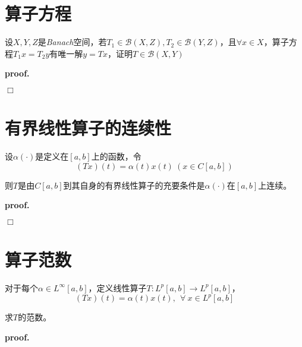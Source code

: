 \section{算子方程}

\begin{mdframed}
    \begin{question}
        设$X,Y,Z$是\textsl{Banach}空间，若$T_1\in \mathcal{B}(X,Z),T_2\in \mathcal{B}(Y,Z)$，且$\forall x\in X$，算子方程$T_1x=T_2y$有唯一解$y=Tx$，证明$T\in \mathcal{B}(X,Y)$
    \end{question}
\end{mdframed}

\textbf{proof.}

$\Box$

\section{有界线性算子的连续性}

\begin{mdframed}
    \begin{question}
        设$\alpha(\cdot)$是定义在$[a,b]$上的函数，令
        \begin{equation}
            (Tx)(t)=\alpha(t)x(t)\ (x\in C[a,b])
        \end{equation}

        则$T$是由$C[a,b]$到其自身的有界线性算子的充要条件是$\alpha(\cdot)$在$[a,b]$上连续。
    \end{question}
\end{mdframed}

\textbf{proof.}

$\Box$

\section{算子范数}

\begin{mdframed}
    \begin{question}
        对于每个$\alpha\in L^{\infty}[a,b]$，定义线性算子$T:L^p[a,b]\rightarrow L^p[a,b]$，
        \begin{equation}
            (Tx)(t)=\alpha(t)x(t),\ \ \forall\ x\in L^p[a,b]
        \end{equation}

        求$T$的范数。
    \end{question}
\end{mdframed}

\textbf{proof.}

